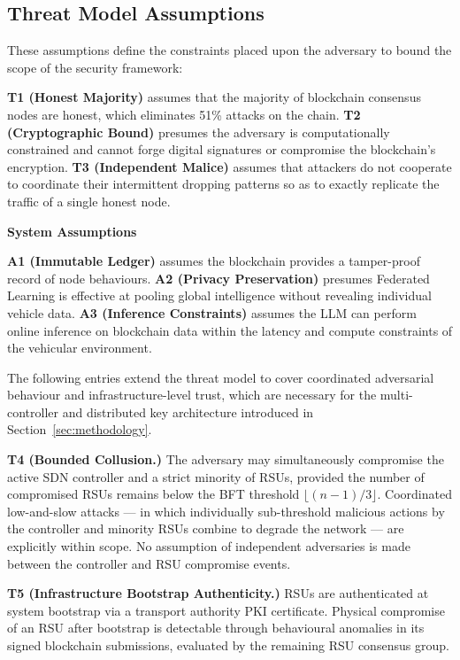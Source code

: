 \documentclass[12pt, a4paper]{report}
\newcommand{\mypar}{\vspace{0.8em}\noindent}
\begin{document}
\subsection{Threat Model Assumptions}

\mypar
These assumptions define the constraints placed upon the adversary to bound the scope of the security framework:

\textbf{T1 (Honest Majority)} assumes that the majority of blockchain consensus nodes are honest, which eliminates 51\% attacks on the chain.
\textbf{T2 (Cryptographic Bound)} presumes the adversary is computationally constrained and cannot forge digital signatures or compromise the blockchain's encryption.
\textbf{T3 (Independent Malice)} assumes that attackers do not cooperate to coordinate their intermittent dropping patterns so as to exactly replicate the traffic of a single honest node.

\mypar
\textbf{System Assumptions}

\textbf{A1 (Immutable Ledger)} assumes the blockchain provides a tamper-proof record of node behaviours.
\textbf{A2 (Privacy Preservation)} presumes Federated Learning is effective at pooling global intelligence without revealing individual vehicle data.
\textbf{A3 (Inference Constraints)} assumes the LLM can perform online inference on blockchain data within the latency and compute constraints of the vehicular environment.

\mypar
The following entries extend the threat model to cover coordinated
adversarial behaviour and infrastructure-level trust, which are
necessary for the multi-controller and distributed key architecture
introduced in Section~\ref{sec:methodology}.

\textbf{T4 (Bounded Collusion.)}
The adversary may simultaneously compromise the active SDN
controller and a strict minority of RSUs, provided the number of
compromised RSUs remains below the BFT threshold
$\lfloor(n-1)/3\rfloor$. Coordinated low-and-slow attacks — in
which individually sub-threshold malicious actions by the
controller and minority RSUs combine to degrade the network — are
explicitly within scope. No assumption of independent adversaries
is made between the controller and RSU compromise events.

\textbf{T5 (Infrastructure Bootstrap Authenticity.)}
RSUs are authenticated at system bootstrap via a transport
authority PKI certificate. Physical compromise of an RSU after
bootstrap is detectable through behavioural anomalies in its
signed blockchain submissions, evaluated by the remaining RSU
consensus group.
\end{document}
